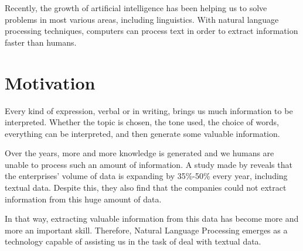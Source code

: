 Recently, the growth of artificial intelligence has been helping us to solve problems in most various areas, including linguistics. With natural language processing techniques, computers can process text in order to extract information faster than humans.

\section{Motivation}




Every kind of expression, verbal or in writing, brings us much information to be interpreted. Whether the topic is chosen, the tone used, the choice of words, everything can be interpreted, and then generate some valuable information.

Over the years, more and more knowledge is generated and we humans are unable to process such an amount of information. A study made by  reveals that the enterprises' volume of data is expanding by 35\%-50\% every year, including textual data. Despite this, they also find that the companies could not extract information from this huge amount of data.

In that way, extracting valuable information from this data has become more and more an important skill. Therefore, Natural Language Processing emerges as a technology capable of assisting us in the task of deal with textual data.

